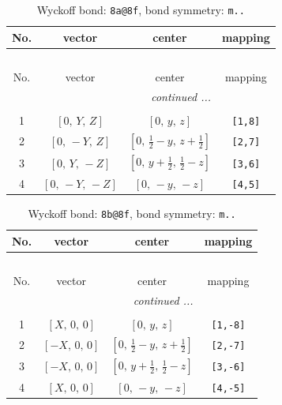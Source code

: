 \documentclass[fleqn,8pt]{jsarticle}
\begin{document}
\begin{longtable}{cccc}
\caption{Wyckoff bond: {\tt 8a@8f}, bond symmetry: {\tt m..}}
 \\
 \hline \hline
No. & vector & center & mapping \\ \hline \endfirsthead

\multicolumn{3}{l}{\tablename\ \thetable{}} \\
 \hline \hline
No. & vector & center & mapping \\ \hline \endhead

 \hline \hline
\multicolumn{3}{r}{\footnotesize\it continued ...} \\ \endfoot

 \hline \hline
\multicolumn{3}{r}{} \\ \endlastfoot

1 & $\left[ 0,\, Y,\, Z \right]$ & $\left[ 0,\, y,\, z \right]$ & {\tt [1,8]} \\ \hline
2 & $\left[ 0,\, - Y,\, Z \right]$ & $\left[ 0,\, \frac{1}{2} - y,\, z + \frac{1}{2} \right]$ & {\tt [2,7]} \\ \hline
3 & $\left[ 0,\, Y,\, - Z \right]$ & $\left[ 0,\, y + \frac{1}{2},\, \frac{1}{2} - z \right]$ & {\tt [3,6]} \\ \hline
4 & $\left[ 0,\, - Y,\, - Z \right]$ & $\left[ 0,\, - y,\, - z \right]$ & {\tt [4,5]} \\
\end{longtable}
\renewcommand{\arraystretch}{1.2}
\begin{longtable}{cccc}
\caption{Wyckoff bond: {\tt 8b@8f}, bond symmetry: {\tt m..}}
 \\
 \hline \hline
No. & vector & center & mapping \\ \hline \endfirsthead

\multicolumn{3}{l}{\tablename\ \thetable{}} \\
 \hline \hline
No. & vector & center & mapping \\ \hline \endhead

 \hline \hline
\multicolumn{3}{r}{\footnotesize\it continued ...} \\ \endfoot

 \hline \hline
\multicolumn{3}{r}{} \\ \endlastfoot

1 & $\left[ X,\, 0,\, 0 \right]$ & $\left[ 0,\, y,\, z \right]$ & {\tt [1,-8]} \\ \hline
2 & $\left[ - X,\, 0,\, 0 \right]$ & $\left[ 0,\, \frac{1}{2} - y,\, z + \frac{1}{2} \right]$ & {\tt [2,-7]} \\ \hline
3 & $\left[ - X,\, 0,\, 0 \right]$ & $\left[ 0,\, y + \frac{1}{2},\, \frac{1}{2} - z \right]$ & {\tt [3,-6]} \\ \hline
4 & $\left[ X,\, 0,\, 0 \right]$ & $\left[ 0,\, - y,\, - z \right]$ & {\tt [4,-5]} \\
\end{longtable}
\end{document}
